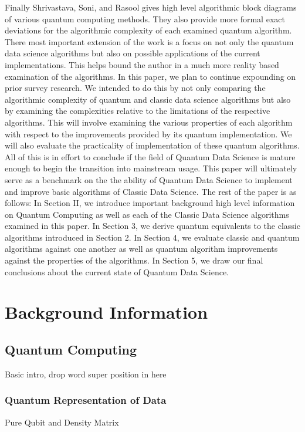 \documentclass[conference]{IEEEtran}
\begin{document}
\newline
\indent Finally Shrivastava, Soni, and Rasool gives high level algorithmic block diagrams of various quantum computing methods. They also provide more formal exact deviations for the algorithmic complexity of each examined quantum algorithm. There most important extension of the work is a focus on not only the quantum data science algorithms but also on possible applications of the current implementations. This helps bound the author in a much more reality based examination of the algorithms.\cite{b8}    
\newline
\indent In this paper, we plan to continue expounding on prior survey research. We intended to do this by not only comparing the algorithmic complexity of quantum and classic data science algorithms but also by examining the complexities relative to the limitations of the respective algorithms. This will involve examining the various properties of each algorithm with respect to the improvements provided by its quantum implementation. We will also evaluate the practicality of implementation of these quantum algorithms. All of this is in effort to conclude if the field of Quantum Data Science is mature enough to begin the transition into mainstream usage. This paper will ultimately serve as a benchmark on the the ability of Quantum Data Science to implement and improve basic algorithms of Classic Data Science. The rest of the paper is as follows: In Section II, we introduce important background high level information on Quantum Computing as well as each of the Classic Data Science algorithms examined in this paper. In Section 3, we derive quantum equivalents to the classic algorithms introduced in Section 2. In Section 4, we evaluate classic and quantum algorithms against one another as well as quantum algorithm improvements against the properties of the algorithms. In Section 5, we draw our final conclusions about the current state of Quantum Data Science.    
\section{Background Information}

\subsection{Quantum Computing}
Basic intro, drop word super position in here
\subsubsection{Quantum Representation of Data}
Pure Qubit and Density Matrix 
\end{document}
